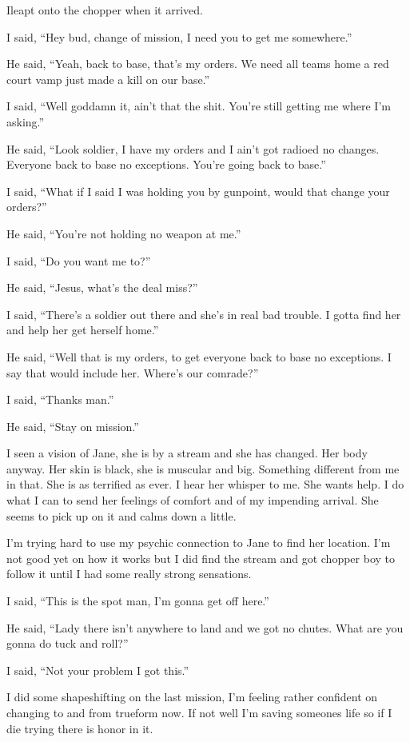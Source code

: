 ﻿\lettrine[lines=2,lraise=0]{I}\space leapt onto the chopper when it arrived.

I said, ``Hey bud, change of mission, I need you to get me somewhere.''

He said, ``Yeah, back to base, that's my orders. We need all teams home a red court vamp just made a kill on our base.''

I said, ``Well goddamn it, ain't that the shit. You're still getting me where I'm asking.''

He said, ``Look soldier, I have my orders and I ain't got radioed no changes. Everyone back to base no exceptions. You're going back to base.''

I said, ``What if I said I was holding you by gunpoint, would that change your orders?''

He said, ``You're not holding no weapon at me.''

I said, ``Do you want me to?''

He said, ``Jesus, what's the deal miss?''

I said, ``There's a soldier out there and she's in real bad trouble. I gotta find her and help her get herself home.''

He said, ``Well that is my orders, to get everyone back to base no exceptions. I say that would include her. Where's our comrade?''

I said, ``Thanks man.''

He said, ``Stay on mission.''


I seen a vision of Jane, she is by a stream and she has changed. Her body anyway. Her skin is black, she is muscular and big. Something different from me in that. She is as terrified as ever. I hear her whisper to me. She wants help. I do what I can to send her feelings of comfort and of my impending arrival. She seems to pick up on it and calms down a little.

\parasep

I'm trying hard to use my psychic connection to Jane to find her location. I'm not good yet on how it works but I did find the stream and got chopper boy to follow it until I had some really strong sensations.

I said, ``This is the spot man, I'm gonna get off here.''

He said, ``Lady there isn't anywhere to land and we got no chutes. What are you gonna do tuck and roll?''

I said, ``Not your problem I got this.''

I did some shapeshifting on the last mission, I'm feeling rather confident on changing to and from trueform now. If not well I'm saving someones life so if I die trying there is honor in it.

